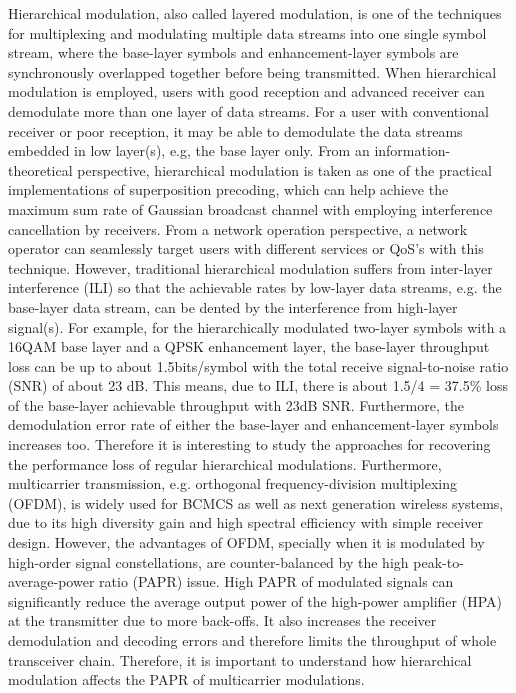 \documentclass[conference]{IEEEtran}
\begin{document}
Hierarchical modulation, also called layered modulation, is one of
the techniques for multiplexing and modulating multiple data
streams into one single symbol stream, where the base-layer
symbols and enhancement-layer symbols are synchronously overlapped
together before being transmitted. When hierarchical modulation is
employed, users with good reception and advanced receiver can
demodulate more than one layer of data streams. For a user with
conventional receiver or poor reception, it may be able to
demodulate the data streams embedded in low layer(s), e.g, the
base layer only. From an information-theoretical perspective,
hierarchical modulation is taken as one of the practical
implementations of superposition precoding, which can help achieve
the maximum sum rate of Gaussian broadcast channel with employing
interference cancellation by receivers. From a network operation
perspective, a network operator can seamlessly target users with
different services or QoS's with this technique. However,
traditional hierarchical modulation suffers from inter-layer
interference (ILI) so that the achievable rates by low-layer data
streams, e.g. the base-layer data stream, can be dented by the
interference from high-layer signal(s). For example, for the
hierarchically modulated two-layer symbols with a 16QAM base layer
and a QPSK enhancement layer, the base-layer throughput loss can
be up to about 1.5bits/symbol with the total receive
signal-to-noise ratio (SNR) of about 23 dB. This means, due to
ILI, there is about 1.5/4 = 37.5\% loss of the base-layer
achievable throughput with 23dB SNR. Furthermore, the demodulation
error rate of either the base-layer and enhancement-layer symbols
increases too. Therefore it is interesting to study the approaches
for recovering the performance loss of regular hierarchical
modulations. Furthermore, multicarrier transmission, e.g.
orthogonal frequency-division multiplexing (OFDM), is widely used
for BCMCS as well as next generation wireless systems, due to its
high diversity gain and high spectral efficiency with simple
receiver design. However, the advantages of OFDM, specially when
it is modulated by high-order signal constellations, are
counter-balanced by the high peak-to-average-power ratio (PAPR)
issue. High PAPR of modulated signals can significantly reduce the
average output power of the high-power amplifier (HPA) at the
transmitter due to more back-offs. It also increases the receiver
demodulation and decoding errors and therefore limits the
throughput of whole transceiver chain. Therefore, it is important
to understand how hierarchical modulation affects the PAPR of
multicarrier modulations.
\end{document}
